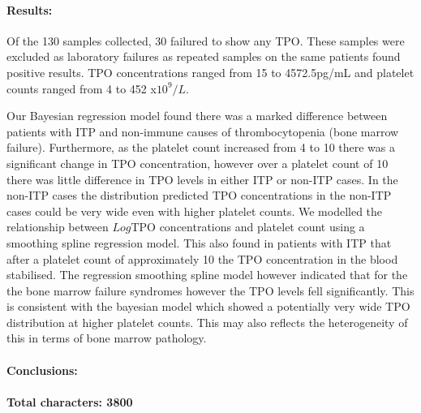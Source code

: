 \documentclass[11pt]{article}
\begin{document}
\paragraph{Results:} Of the 130 samples collected, 30 failured to show any TPO. These samples were excluded as laboratory failures as repeated samples on the same patients found positive results. TPO concentrations ranged from 15 to 4572.5pg/mL and platelet counts ranged from 4 to 452 x$10^9/L$.

Our Bayesian regression model found there was a marked difference between patients with ITP and non-immune causes of thrombocytopenia (bone marrow failure). Furthermore, as the platelet count increased from 4 to 10 there was a significant change in TPO concentration, however over a platelet count of 10 there was little difference in TPO levels in either ITP or non-ITP cases. In the non-ITP cases the distribution predicted TPO concentrations in the non-ITP cases could be very wide even with higher platelet counts. We modelled the relationship between $Log$TPO concentrations and platelet count using a smoothing spline regression model. This also found in patients with ITP that after a platelet count of approximately 10 the TPO concentration in the blood stabilised. The regression smoothing spline model however indicated that for the the bone marrow failure syndromes however the TPO levels fell significantly. This is consistent with the bayesian model which showed a potentially very wide TPO distribution at higher platelet counts. This may also reflects the heterogeneity of this in terms of bone marrow pathology.
\paragraph{Conclusions:}


\paragraph{}
\textbf{Total characters: 3800}
\end{document}

